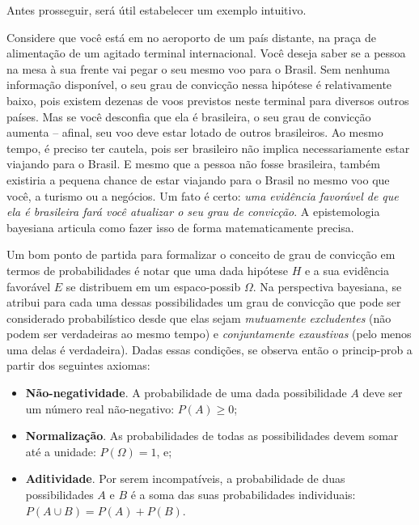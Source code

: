 \documentclass[./main.tex]{subfiles}
\begin{document}
\par Antes prosseguir, será útil estabelecer um exemplo intuitivo. 

\par Considere que você está em no aeroporto de um país distante, na praça de alimentação de um agitado terminal internacional. Você deseja saber se a pessoa na mesa à sua frente vai pegar o seu mesmo voo para o Brasil. Sem nenhuma informação disponível, o seu grau de convicção nessa hipótese é relativamente baixo, pois existem dezenas de voos previstos neste terminal para diversos outros países. Mas se você desconfia que ela é brasileira, o seu grau de convicção aumenta – afinal, seu voo deve estar lotado de outros brasileiros. Ao mesmo tempo, é preciso ter cautela, pois ser brasileiro não implica necessariamente estar viajando para o Brasil. E mesmo que a pessoa não fosse brasileira, também existiria a pequena chance de estar viajando para o Brasil no mesmo voo que você, a turismo ou a negócios. Um fato é certo: \textit{uma evidência favorável de que ela é brasileira fará você atualizar o seu grau de convicção}. A epistemologia bayesiana articula como fazer isso de forma matematicamente precisa.

\par Um bom ponto de partida para formalizar o conceito de grau de convicção em termos de probabilidades é notar que uma dada hipótese $H$ e a sua evidência favorável $E$ se distribuem em um \gls{espaco-possib} $\Omega$. Na perspectiva bayesiana, se atribui para cada uma dessas possibilidades um grau de convicção que pode ser considerado probabilístico desde que elas sejam \textit{mutuamente excludentes} (não podem ser verdadeiras ao mesmo tempo) e \textit{conjuntamente exaustivas} (pelo menos uma delas é verdadeira). Dadas essas condições, se observa então o \gls{princip-prob} a partir dos seguintes axiomas:
\begin{itemize}
    \item \textbf{Não-negatividade}. A probabilidade de uma dada possibilidade $A$ deve ser um número real não-negativo: $P(A) \geq 0$;
    \item \textbf{Normalização}. As probabilidades de todas as possibilidades devem somar até a unidade: $P(\Omega) = 1$, e;
    \item \textbf{Aditividade}. Por serem incompatíveis, a probabilidade de duas possibilidades $A$ e $B$ é a soma das suas probabilidades individuais: $P(A \cup B ) = P(A) + P(B)$.
\end{itemize}
\end{document}
